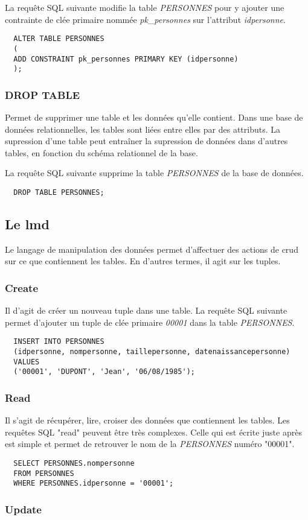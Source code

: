 La requête SQL suivante modifie la table \textit{PERSONNES} pour y ajouter une contrainte de clée primaire nommée \textit{pk\_personnes} sur l'attribut \textit{idpersonne}.

\begin{lstlisting}
  ALTER TABLE PERSONNES
  (
  ADD CONSTRAINT pk_personnes PRIMARY KEY (idpersonne)
  );
\end{lstlisting}

\subsubsection{DROP TABLE}
Permet de supprimer une table et les données qu'elle contient.
Dans une base de données relationnelles, les tables sont liées entre elles par des attributs.
La supression d'une table peut entraîner la supression de données dans d'autres tables, en fonction du schéma relationnel de la base.

La requête SQL suivante supprime la table \textit{PERSONNES} de la base de données.
\begin{lstlisting}
  DROP TABLE PERSONNES;
\end{lstlisting}

\subsection{Le \gls{lmd}}
Le langage de manipulation des données permet d'affectuer des actions de \gls{crud} sur ce que contiennent les tables.
En d'autres termes, il agit sur les tuples.

\subsubsection{Create}
Il d'agit de créer un nouveau tuple dans une table.
La requête SQL suivante permet d'ajouter un tuple de clée primaire \textit{00001} dans la table \textit{PERSONNES}.
\begin{lstlisting}
  INSERT INTO PERSONNES
  (idpersonne, nompersonne, taillepersonne, datenaissancepersonne)
  VALUES
  ('00001', 'DUPONT', 'Jean', '06/08/1985');
\end{lstlisting}

\subsubsection{Read}
Il s'agit de récupérer, lire, croiser des données que contiennent les tables.
Les requêtes SQL  "read" peuvent être très complexes.
Celle qui est écrite juste après est simple et permet de retrouver le nom de la \textit{PERSONNES} numéro "00001".
\begin{lstlisting}
  SELECT PERSONNES.nompersonne
  FROM PERSONNES
  WHERE PERSONNES.idpersonne = '00001';
\end{lstlisting}

\subsubsection{Update}
